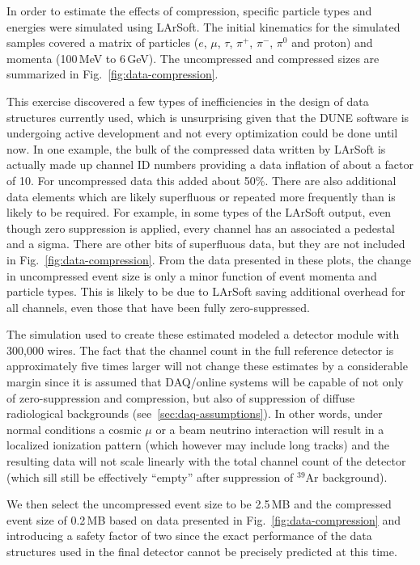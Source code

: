 In order to estimate the effects of compression, specific particle types and energies were simulated using LArSoft.
The initial kinematics for the simulated samples covered a matrix of
particles ($e$, $\mu$, $\tau$, $\pi^+$, $\pi^-$, $\pi^0$ and proton) and momenta
(100\,MeV to 6\,GeV). The uncompressed and compressed sizes are summarized in Fig.~\ref{fig:data-compression}.

This exercise discovered a few types of inefficiencies in the design of data structures
currently used, which is unsurprising given that the DUNE software is undergoing active development
and not every optimization could be done until now. In one example, the bulk of the
compressed data written by LArSoft is actually made up channel ID
numbers providing a data inflation of about a factor of 10.
For uncompressed data this added about 50\%.
There are also additional data elements which are likely superfluous or
repeated more frequently than is likely to be required.
For example, in some types of the LArSoft output, even though zero suppression is applied, every
channel has an associated a pedestal and a sigma. There are other bits of superfluous data, but
they are not included in Fig.~\ref{fig:data-compression}. From the data presented in these
plots, the change in uncompressed event size is only a minor function of event momenta and
particle types. This is likely to be due to LArSoft saving additional overhead for all
channels, even those that have been fully zero-suppressed.

The simulation used to create these estimated modeled a detector module with
300,000 wires. The fact that the channel count in the full reference detector is
approximately five times larger will not change these estimates by a considerable margin
since it is assumed that DAQ/online systems will be capable of
not only of zero-suppression and compression, but also of suppression
of diffuse radiological backgrounds (see~\ref{sec:daq-assumptions}).
In other words, under normal conditions a cosmic $\mu$ or a beam
neutrino interaction will result in a localized ionization pattern (which
however may include long tracks) and the resulting data will not
scale linearly with the total channel count of the detector (which
sill still be effectively ``empty'' after suppression of $^{39}$Ar
background).

We then select the uncompressed event size to be 2.5\,MB and
the compressed event size of 0.2\,MB based
on data presented in Fig.~\ref{fig:data-compression} and
introducing a safety factor of two since the exact performance
of the data structures used in the final detector cannot be precisely predicted at this time.

